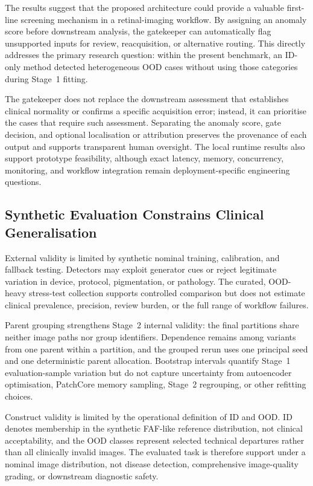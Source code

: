 \documentclass[fleqn,12pt]{olplainarticle}
\begin{document}
The results suggest that the proposed architecture could provide a valuable
first-line screening mechanism in a retinal-imaging workflow. By assigning an
anomaly score before downstream analysis, the gatekeeper can automatically
flag unsupported inputs for review, reacquisition, or alternative routing.
This directly addresses the primary research question: within the present
benchmark, an ID-only method detected heterogeneous OOD cases without using
those categories during Stage~1 fitting.

The gatekeeper does not replace the downstream assessment that establishes
clinical normality or confirms a specific acquisition error; instead, it can
prioritise the cases that require such assessment. Separating the anomaly
score, gate decision, and optional localisation or attribution preserves the
provenance of each output and supports transparent human oversight. The local
runtime results also support prototype feasibility, although exact latency,
memory, concurrency, monitoring, and workflow integration remain
deployment-specific engineering questions.

\subsection{Synthetic Evaluation Constrains Clinical Generalisation}
\label{subsec:discussion_validity}

External validity is limited by synthetic nominal training, calibration, and fallback testing. Detectors may exploit generator cues or reject legitimate variation in device, protocol, pigmentation, or pathology. The curated, OOD-heavy stress-test collection supports controlled comparison but does not estimate clinical prevalence, precision, review burden, or the full range of workflow failures.

Parent grouping strengthens Stage~2 internal validity: the final partitions
share neither image paths nor group identifiers. Dependence remains among
variants from one parent within a partition, and the grouped rerun uses one
principal seed and one deterministic parent allocation. Bootstrap intervals
quantify Stage~1 evaluation-sample variation but do not capture uncertainty
from autoencoder optimisation, PatchCore memory sampling, Stage~2 regrouping,
or other refitting choices.

Construct validity is limited by the operational definition of ID and OOD.
ID denotes membership in the synthetic FAF-like reference distribution, not
clinical acceptability, and the OOD classes represent selected technical
departures rather than all clinically invalid images. The evaluated task is
therefore support under a nominal image distribution, not disease detection,
comprehensive image-quality grading, or downstream diagnostic safety.
\end{document}
